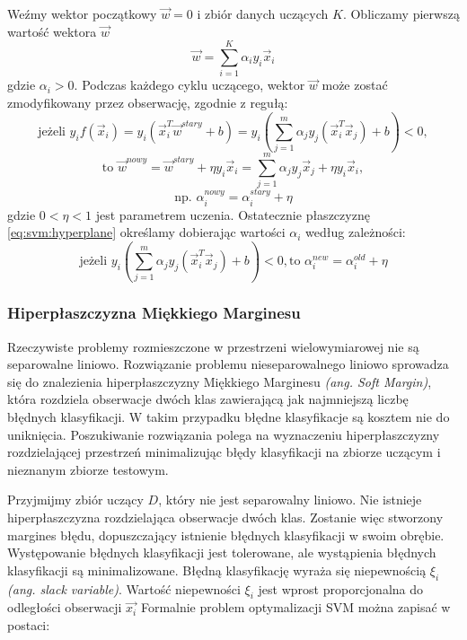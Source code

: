 \documentclass[a4paper,12pt,twoside,openany]{report}
\newcommand{\ang}[1]{\textit{(ang. #1)}}
\begin{document}
\begin{enumerate}
Weźmy wektor początkowy $\vec{w} = 0$ i zbiór danych uczących $K$.
Obliczamy pierwszą wartość wektora $\vec{w}$
\begin{equation}\label{eq:svm:hyperplane}
	{\vec{w}}=\sum_{i=1}^K \alpha_i y_i {\vec{x}}_i
\end{equation}
gdzie $\alpha_i>0$. 
Podczas każdego cyklu uczącego, wektor $\vec{w}$ może zostać zmodyfikowany przez obserwację, 
zgodnie z regułą:
\begin{equation}
	\mbox{jeżeli } y_i f({\vec{x}}_i)=y_i ({\vec{x}}_i^T{\vec{w}}^{stary}+b)
	=y_i\left(\sum_{j=1}^m \alpha_j y_j({\vec{x}}_i^T{\vec{x}}_j)+b\right)<0,
\end{equation}
\begin{equation}
	\mbox{to } {\vec{w}}^{nowy}={\vec{w}}^{stary}+\eta y_i {\vec{x}}_i
	=\sum_{j=1}^{m} \alpha_j y_j\vec{x}_j +\eta y_i {\vec{x}}_i,
\end{equation}
\begin{equation}
	\mbox{np. }
	\alpha_i^{nowy}=\alpha_i^{stary}+\eta
\end{equation}
gdzie $0 < \eta < 1$ jest parametrem uczenia.
Ostatecznie płaszczyznę \ref{eq:svm:hyperplane} określamy dobierając wartości $\alpha_i$ według zależności: 
\begin{equation}
	\mbox{jeżeli } y_i\left(\sum_{j=1}^m \alpha_j y_j({\vec{x}}_i^T\vec{x}_j)+b\right)<0,
	\mbox{to } \alpha_i^{new}=\alpha_i^{old}+\eta 
\end{equation}

\subsubsection{Hiperpłaszczyzna Miękkiego Marginesu}
Rzeczywiste problemy rozmieszczone w przestrzeni wielowymiarowej nie są separowalne liniowo. 
Rozwiązanie problemu nieseparowalnego liniowo sprowadza się do znalezienia hiperpłaszczyzny Miękkiego Marginesu \ang{Soft Margin}, 
która rozdziela obserwacje dwóch klas zawierającą jak najmniejszą liczbę błędnych klasyfikacji.
W takim przypadku błędne klasyfikacje są kosztem nie do uniknięcia. 
Poszukiwanie rozwiązania polega na wyznaczeniu hiperpłaszczyzny rozdzielającej przestrzeń 
minimalizując błędy klasyfikacji na zbiorze uczącym i nieznanym zbiorze testowym.

Przyjmijmy zbiór uczący $D$, który nie jest separowalny liniowo. 
Nie istnieje hiperpłaszczyzna rozdzielająca obserwacje dwóch klas.
Zostanie więc stworzony margines błędu, dopuszczający istnienie błędnych klasyfikacji w swoim obrębie.
Występowanie błędnych klasyfikacji jest tolerowane, ale wystąpienia błędnych klasyfikacji są minimalizowane.
Błędną klasyfikację wyraża się niepewnością $\xi_i$ \ang{slack variable}. 
Wartość niepewności $\xi_i$ jest wprost proporcjonalna do odległości obserwacji $\vec{x_i}$
Formalnie problem optymalizacji SVM można zapisać w postaci:


\end{enumerate}
\end{document}
